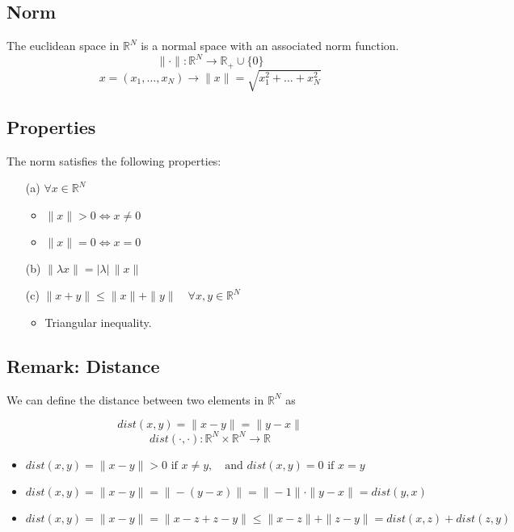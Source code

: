 \documentclass[11pt]{article}
\begin{document}
\subsection*{Norm}

The euclidean space in $\mathbb{R}^N$ is a normal space with an associated norm function.
\[ 
\| \cdot \| : \mathbb{R}^N \rightarrow \mathbb{R}_+ \cup \{0\}
\]
\[
x = (x_1, \dots ,x_N) \rightarrow \| x \| = \sqrt{x_1^2 + \dots + x_N^2}
\]

\subsection*{Properties}
The norm satisfies the following properties:
\begin{itemize}
    \item[(a)] $\forall x \in \mathbb{R}^N$
    \begin{itemize}
        \item $\|x\| > 0 \iff x \neq 0$
        \item $\|x\| = 0 \iff x = 0$
    \end{itemize}
    \item[(b)] $\|\lambda x\| = |\lambda| \, \|x\|$
    \item[(c)] $\|x + y\| \leq \|x\| + \|y\| \quad \forall x, y \in \mathbb{R}^N$
    \begin{itemize}
        \item Triangular inequality.
    \end{itemize}
\end{itemize}


\subsection*{Remark: Distance}
We can define the distance between two elements in $\mathbb{R}^N$ as 

\[ 
dist(x,y) = \|x - y\| = \|y - x\|
\] 
\[
dist(\cdot ,\cdot) : \mathbb{R}^N \times \mathbb{R}^N \rightarrow \mathbb{R}
\]

\begin{itemize}
    \item $dist(x,y) = \|x - y\| > 0 \text{ if } x \neq y, \quad \text{and } dist(x,y) = 0 \text{ if } x = y$
    \item $dist(x,y) = \|x - y\| = \|-(y - x)\| = \|-1\| \cdot \|y - x\| = dist(y,x)$
    \item $dist(x,y) = \|x - y\| = \|x - z + z - y\| \leq \|x - z\| + \|z - y\| = dist(x,z) + dist(z,y)$ 
\end{itemize}
\end{document}
